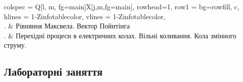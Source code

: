 \documentclass{Syllabus}
\def\lit{\textit{Опрацювати:\ }}
\def\probl{\textit{Задачі:\ }}
\begin{document}
\begin{center}
\begin{longtblr}[]{
    	colspec = {Q[l, m, fg=main]X[j,m,fg=main]},
        rowhead=1,
    	row{1} = {bg=rowfill, c},
    	hlines = {1-Z}{infotablecolor},
    	vlines = {1-Z}{infotablecolor},
    	}
		\\
		\rownumber. & Рівняння Максвела. Вектор Пой\-н\-тін\-га
		\\
		\rownumber. & Перехідні процеси в електричних колах. Вільні коливання. Кола змінного струму.
		\\
	\end{longtblr}
\end{center}

\subsection*{Лабораторні заняття}\setcounter{magicrownumbers}{0}
\end{document}
